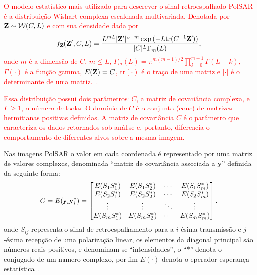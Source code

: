 \documentclass[a4paper,12pt]{article}
\begin{document}
\textcolor{red}{O modelo estatístico mais utilizado para descrever o sinal retroespalhado PolSAR é a distribuição Wishart complexa escalonada multivariada. Denotada por ${\bf Z} \sim \mathcal{W}(C,L)$ e com sua densidade dada por 
\begin{equation*}%
f_{\bf Z}({\bf Z'},C,L)=\dfrac{L^{mL}\vert {\bf Z'} \vert^{L-m}\exp{(-L\mbox{tr}(C^{-1}{\bf Z'}))} }{\vert C \vert^{L}\Gamma_{m}(L)},
\end{equation*}
onde $m$ é a dimensão  de $C$, $m\leq L$, $\Gamma_{m}(L)=\pi^{m(m-1)/2}\prod_{k=0}^{m-1}\Gamma(L-k)$, $\Gamma(\cdot)$ é a função gamma, $E({\bf Z})=C$, $\mbox{tr}(\cdot)$ é o traço de uma matriz e $\vert \cdot \vert$ é o determinante de uma matriz.~\citep{Frery-2013,Frery-2014,Nascimento-2014}.}

\textcolor{red}{Essa distribuição possui dois parâmetros: $C$, a matriz de covariância complexa, e $L \geq 1$, o número de looks. O domínio de $C$ é o conjunto (cone) de matrizes hermitianas positivas definidas. A matriz de covariância $C$ é o parâmetro que caracteriza os dados retornados sob análise e, portanto, diferencia o comportamento de diferentes alvos sobre a mesma imagem.}

Nas imagens Pol{SAR} o valor em cada coordenada é representado por uma matriz de valores complexos, denominada ``matriz de covariância associada a {\bf y}'' definida da seguinte forma:
\begin{equation*}%
C=E({\bf y}_{i}{\bf y}_{i}^{*})=\begin{bmatrix}
	E(S_{1}S_{1}^{*})	&	E(S_{1}S_{2}^{*})	&	\cdots	&	E(S_{1}S_{m}^{*})\\
	E(S_{2}S_{1}^{*})	&	E(S_{2}S_{2}^{*})	&	\cdots	&	E(S_{2}S_{m}^{*})\\
		\vdots			&			\vdots		&	\ddots	&		\vdots		\\
	E(S_{m}S_{1}^{*})	&	E(S_{m}S_{2}^{*})	&	\cdots	&	E(S_{m}S_{m}^{*})\\		
\end{bmatrix}.
\end{equation*}
onde $S_{ij}$ representa o sinal de retroespalhamento para a $i$-ésima transmissão e $j$-ésima recepção de uma polarização linear, os elementos da diagonal principal são números reais positivos, e {denominam-se} ``intensidades''\label{intensidades}, o ``$*$'' denota o conjugado de um número complexo, por fim $E(\cdot)$ denota o operador esperança estatística~\citep{Lee-2009,Nascimento-2014}.
\end{document}
